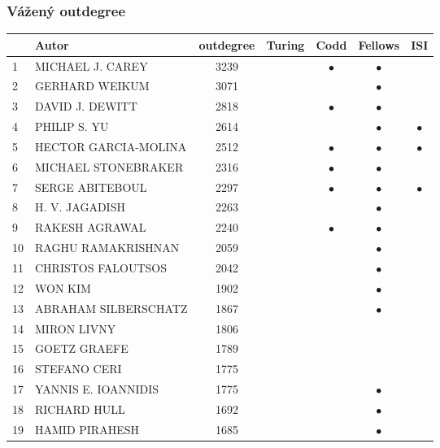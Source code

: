 \documentclass[12pt,titlepage]{report}
\begin{document}
\subsubsection{Vážený outdegree}
\begin{center}
\begin{tabular}{|l|l|c|c|c|c|c|}
\hline
& {\bf Autor} & {\bf outdegree} & {\bf Turing} & {\bf Codd} & {\bf Fellows} & {\bf ISI} \\
\hline
1  & MICHAEL J. CAREY & 3239    &&$\bullet$&$\bullet$&         \\
\hline
2  & GERHARD WEIKUM & 3071      &&         &$\bullet$&         \\
\hline
3  & DAVID J. DEWITT & 2818     &&$\bullet$&$\bullet$&         \\
\hline
4  & PHILIP S. YU & 2614        &&         &$\bullet$&$\bullet$\\
\hline
5  & HECTOR GARCIA-MOLINA & 2512&&$\bullet$&$\bullet$&$\bullet$\\
\hline
6  & MICHAEL STONEBRAKER & 2316 &&$\bullet$&$\bullet$&         \\
\hline
7  & SERGE ABITEBOUL & 2297     &&$\bullet$&$\bullet$&$\bullet$\\
\hline
8  & H. V. JAGADISH & 2263      &&         &$\bullet$&         \\
\hline
9  & RAKESH AGRAWAL & 2240      &&$\bullet$&$\bullet$&         \\
\hline
10 & RAGHU RAMAKRISHNAN & 2059  &&         &$\bullet$&         \\
\hline
11 & CHRISTOS FALOUTSOS & 2042  &&         &$\bullet$&         \\
\hline
12 & WON KIM & 1902             &&         &$\bullet$&         \\
\hline
13 & ABRAHAM SILBERSCHATZ & 1867&&         &$\bullet$&         \\
\hline
14 & MIRON LIVNY & 1806         &&         &         &         \\
\hline
15 & GOETZ GRAEFE & 1789        &&         &         &         \\
\hline
16 & STEFANO CERI & 1775        &&         &         &         \\
\hline
17 & YANNIS E. IOANNIDIS & 1775 &&         &$\bullet$&         \\
\hline
18 & RICHARD HULL & 1692        &&         &$\bullet$&         \\
\hline
19 & HAMID PIRAHESH & 1685      &&         &$\bullet$&         \\

\end{tabular}
\end{center}
\end{document}
